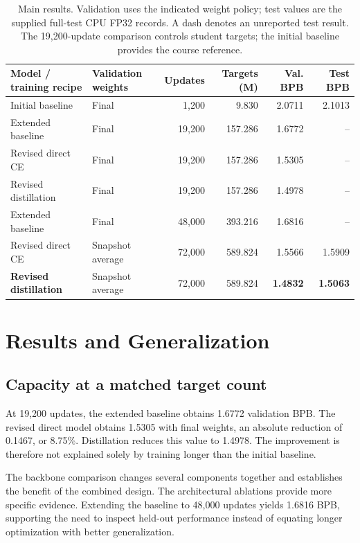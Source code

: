 \documentclass[10pt,twocolumn,letterpaper]{article}
\begin{document}
\begin{table}[t]
\centering\small
\begin{tabular*}{\textwidth}{@{\extracolsep{\fill}}llrrrr@{}}
\toprule
Model / training recipe & Validation weights & Updates & Targets (M) & Val. BPB & Test BPB\\
\midrule
Initial baseline & Final & 1,200 & 9.830 & 2.0711 & 2.1013\\
Extended baseline & Final & 19,200 & 157.286 & 1.6772 & --\\
Revised direct CE & Final & 19,200 & 157.286 & 1.5305 & --\\
Revised distillation & Final & 19,200 & 157.286 & 1.4978 & --\\
Extended baseline & Final & 48,000 & 393.216 & 1.6816 & --\\
Revised direct CE & Snapshot average & 72,000 & 589.824 & 1.5566 & 1.5909\\
\textbf{Revised distillation} & Snapshot average & 72,000 & 589.824 & \textbf{1.4832} & \textbf{1.5063}\\
\bottomrule
\end{tabular*}
\caption{Main results. Validation uses the indicated weight policy; test
values are the supplied full-test CPU FP32 records. A dash denotes an
unreported test result. The 19,200-update comparison controls student targets;
the initial baseline provides the course reference.}
\label{tab:main}
\end{table}

\section{Results and Generalization}
\subsection{Capacity at a matched target count}
At 19,200 updates, the extended baseline obtains 1.6772 validation BPB.
The revised direct model obtains 1.5305 with final weights, an absolute
reduction of 0.1467, or 8.75\%. Distillation reduces this value to 1.4978.
The improvement is therefore not explained solely by training longer than
the initial baseline.

The backbone comparison changes several components together and establishes
the benefit of the combined design. The architectural ablations provide
more specific evidence. Extending the baseline to 48,000 updates yields
1.6816 BPB, supporting the need to inspect held-out performance instead
of equating longer optimization with better generalization.
\end{document}
